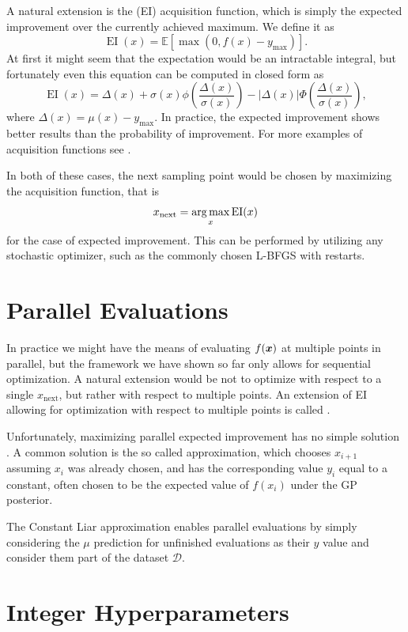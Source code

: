 A natural extension is the  (EI) acquisition function,
which is simply the expected improvement over the currently achieved maximum.
We define it as $$\operatorname{EI}(x) = \mathbb{E}[\max(0, f(x) - y_{\max})].$$ At first it might seem that
the expectation would be an intractable integral, but fortunately even this
equation can be computed in closed form as
$$
\operatorname{EI}(x) = \Delta(x) + \sigma(x) \phi \left( \frac{\Delta(x)}{\sigma(x)} \right) - |\Delta(x)| \Phi \left( \frac{\Delta(x)}{\sigma(x)} \right),
$$
where $\Delta(x) = \mu(x) - y_{\max}$. In practice, the expected improvement shows better results
than the probability of improvement. For more examples of acquisition functions see
\cite{frazier2018tutorial}.

In both of these cases, the next sampling point would be chosen by maximizing
the acquisition function, that is $$x_{\operatorname{next}} = \operatorname*{arg\,max}_x \operatorname{EI}(x)$$ for
the case of expected improvement. This can be performed by utilizing any stochastic optimizer,
such as the commonly chosen L-BFGS with restarts.


\section{Parallel Evaluations}
\label{section:parallel-evaluations}

In practice we might have the means of evaluating $f({\boldsymbol{x}})$ at multiple points
in parallel, but the framework we have shown so far only allows for sequential
optimization. A natural extension would be not to optimize with respect to a
single $x_{\operatorname{next}}$, but rather with respect to multiple points.
An extension of EI allowing for optimization with respect to multiple points is
called .

Unfortunately, maximizing parallel expected improvement has no simple solution
\citep{frazier2018tutorial}. A common solution is the so called
 approximation, which chooses $x_{i+1}$ assuming $x_i$
was already chosen, and has the corresponding value $y_i$ equal to a constant,
often chosen to be the expected value of $f(x_i)$ under the GP posterior.

The Constant Liar approximation enables parallel evaluations by simply
considering the $\mu$ prediction for unfinished evaluations as their $y$ value
and consider them part of the dataset $\mathcal{D}$.


\section{Integer Hyperparameters}
\label{section:integer-hyperparameters}


